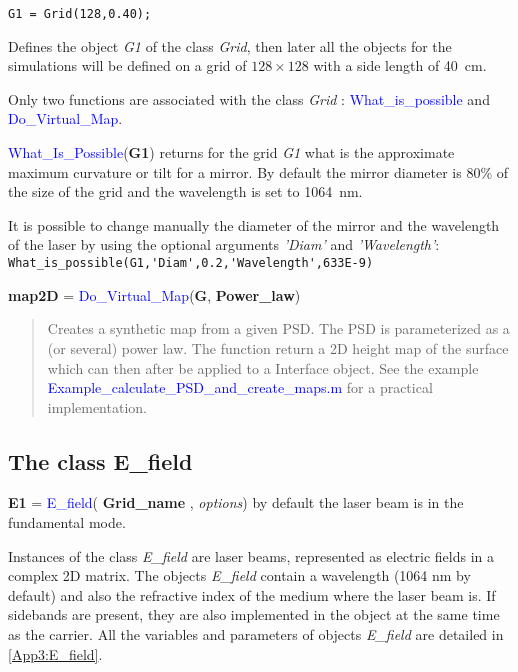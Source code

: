 \begin{verbatim}
G1 = Grid(128,0.40);
\end{verbatim}

Defines the object \textsl{G1} of the class \textsl{Grid}, then later all the objects for the simulations will be defined on a grid of $128 \times 128$ with a side length of 40~cm.

Only two functions are associated with the class \textsl{Grid} : \textcolor{blue}{What\_is\_possible} and \textcolor{blue}{Do\_Virtual\_Map}.

\textcolor{blue}{What\_Is\_Possible}(\textbf{G1}) returns for the grid \textsl{G1} what is the approximate maximum curvature or tilt for a mirror. By default the mirror diameter is 80\% of the size of the grid and the wavelength is set to 1064~nm.

It is possible to change manually the diameter of the mirror and the wavelength of the laser by using the optional arguments \emph{'Diam'} and \emph{'Wavelength'}: \verb? What_is_possible(G1,'Diam',0.2,'Wavelength',633E-9) ?

\noindent \textbf{map2D} = \textcolor{blue}{Do\_Virtual\_Map}(\textbf{G}, \textbf{Power\_law})
\vspace*{-0.2cm}
\begin{quote}
Creates a synthetic map from a given PSD. The PSD is parameterized as a (or several) power law. The function return a 2D height map of the surface which can then after be applied to a Interface object. See the example \textcolor{blue}{Example\_calculate\_PSD\_and\_create\_maps.m} for a practical implementation.
\end{quote}


\subsection{The class E\_field}
\textbf{E1} = \textcolor{blue}{E\_field}( \textbf{Grid\_name} , \emph{options}) by default the laser beam is in the fundamental mode.

Instances of the class \textsl{E\_field} are laser beams, represented as electric fields in a complex 2D matrix. The objects \textsl{E\_field} contain a wavelength (1064 nm by default) and also the refractive index of the medium where the laser beam is. If sidebands are present, they are also implemented in the object at the same time as the carrier. All the variables and parameters of objects \textsl{E\_field} are detailed in \ref{App3:E_field}.

